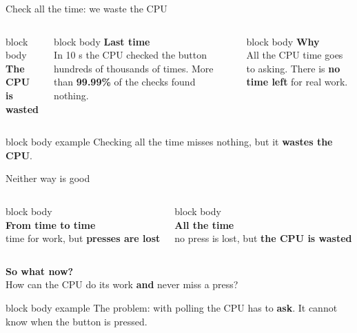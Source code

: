 \documentclass[aspectratio=169,10pt]{beamer}
\newcommand{\stepbox}[2]{%
  \begin{beamercolorbox}[rounded=true,sep=0.09cm,wd=\linewidth]{block body}
    \footnotesize\textbf{#1}\\ #2
  \end{beamercolorbox}\vspace{0.06cm}}
\newcommand{\keymsg}[1]{%
  \begin{beamercolorbox}[rounded=true,sep=0.1cm,wd=\textwidth]{block body example}
    \centering\footnotesize #1
  \end{beamercolorbox}}
\newcommand{\qcard}[2]{%
  \begin{beamercolorbox}[rounded=true,sep=0.14cm,wd=\linewidth]{block body}
    \centering{\Large\textcolor{AccentOrange}{#1}}\\[0.12cm]
    \footnotesize #2
  \end{beamercolorbox}}
\begin{document}
\begin{frame}{Check all the time: we waste the CPU}
  \begin{columns}[c,onlytextwidth]
      \qcard{\faHourglassHalf}{\textbf{The CPU is wasted}}
      \stepbox{Last time}{In 10 s the CPU checked the button hundreds of thousands of times.
        More than \textbf{99.99\%} of the checks found nothing.}
      \stepbox{Why}{All the CPU time goes to asking. There is \textbf{no time left} for real work.}
  \end{columns}
  \vfill
  \keymsg{Checking all the time misses nothing, but it \textbf{wastes the CPU}.}
\end{frame}

\begin{frame}{Neither way is good}
  \vfill
  \begin{columns}[T,onlytextwidth]
      \qcard{\faClock}{\textbf{From time to time}\\[3pt]
        time for work, but \textcolor{MissRed}{\textbf{presses are lost}}}
      \qcard{\faIcon{sync-alt}}{\textbf{All the time}\\[3pt]
        no press is lost, but \textcolor{MissRed}{\textbf{the CPU is wasted}}}
  \end{columns}
  \vspace{0.5cm}
  \begin{center}
    \Large\textbf{So what now?}\\[0.15cm]
    \small How can the CPU do its work \textbf{and} never miss a press?
  \end{center}
  \vfill
  \keymsg{The problem: with polling the CPU has to \textbf{ask}. It cannot know when the button is pressed.}
\end{frame}
\end{document}

